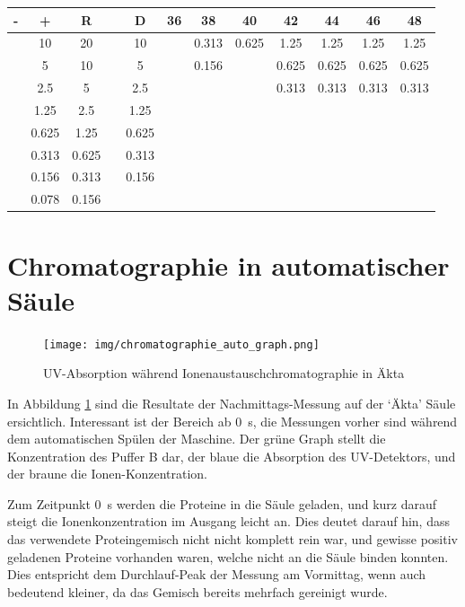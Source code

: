 \documentclass[a4paper,german]{scrreprt}
\begin{document}
\begin{tabu}{cccccccccccc}
	\toprule
	- & +      & R      & & D      & 36 & 38    & 40    & 42     & 44    & 46    & 48    \\
	\midrule
	  & 10     & 20     & & 10     &    & 0.313 & 0.625 & 1.25   & 1.25  & 1.25  & 1.25  \\ 
	  &  5     & 10     & &  5     &    & 0.156 &       & 0.625  & 0.625 & 0.625 & 0.625 \\ 
	  &  2.5   &  5     & &  2.5   &    &       &       & 0.313  & 0.313 & 0.313 & 0.313 \\ 
	  &  1.25  &  2.5   & &  1.25  &    &       &       &        &       &       &       \\ 
	  &  0.625 &  1.25  & &  0.625 &    &       &       &        &       &       &       \\ 
	  &  0.313 &  0.625 & &  0.313 &    &       &       &        &       &       &       \\ 
	  &  0.156 &  0.313 & &  0.156 &    &       &       &        &       &       &       \\ 
	  &  0.078 &  0.156 & &        &    &       &       &        &       &       &       \\ 
	\bottomrule
\end{tabu}

\section{Chromatographie in automatischer Säule} 

\begin{figure}[h]
	\centering
	\texttt{[image: img/chromatographie\_auto\_graph.png]}
	\caption{UV-Absorption während Ionenaustauschchromatographie in Äkta}
	\label{fig:chrom_graph_auto}
\end{figure}

In Abbildung \ref{fig:chrom_graph_auto} sind die Resultate der
Nachmittags-Messung auf der `Äkta' Säule ersichtlich. Interessant ist der
Bereich ab \SI{0}{s}, die Messungen vorher sind während dem automatischen
Spülen der Maschine. Der grüne Graph stellt die Konzentration des Puffer B dar,
der blaue die Absorption des UV-Detektors, und der braune die Ionen-Konzentration.

Zum Zeitpunkt \SI{0}{s} werden die Proteine in die Säule geladen, und kurz
darauf steigt die Ionenkonzentration im Ausgang leicht an. Dies deutet darauf
hin, dass das verwendete Proteingemisch nicht nicht komplett rein war, und
gewisse positiv geladenen Proteine vorhanden waren, welche nicht an die Säule
binden konnten. Dies entspricht dem Durchlauf-Peak der Messung am Vormittag,
wenn auch bedeutend kleiner, da das Gemisch bereits mehrfach gereinigt wurde.
\end{document}

